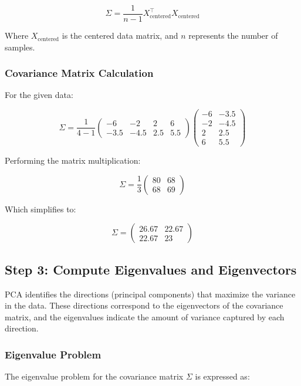 \documentclass{exam}
\begin{document}
\[
\Sigma = \frac{1}{n-1} X_{\text{centered}}^\top X_{\text{centered}}
\]

Where \( X_{\text{centered}} \) is the centered data matrix, and \( n \) represents the number of samples.

\subsubsection*{Covariance Matrix Calculation}

For the given data:

\[
\Sigma = \frac{1}{4-1} \begin{pmatrix} -6 & -2 & 2 & 6 \\ -3.5 & -4.5 & 2.5 & 5.5 \end{pmatrix} \begin{pmatrix} -6 & -3.5 \\ -2 & -4.5 \\ 2 & 2.5 \\ 6 & 5.5 \end{pmatrix}
\]

Performing the matrix multiplication:

\[
\Sigma = \frac{1}{3} \begin{pmatrix} 80 & 68 \\ 68 & 69 \end{pmatrix}
\]

Which simplifies to:

\[
\Sigma = \begin{pmatrix} 26.67 & 22.67 \\ 22.67 & 23 \end{pmatrix}
\]

\subsection{Step 3: Compute Eigenvalues and Eigenvectors}

PCA identifies the directions (principal components) that maximize the variance in the data. These directions correspond to the eigenvectors of the covariance matrix, and the eigenvalues indicate the amount of variance captured by each direction.

\subsubsection*{Eigenvalue Problem}

The eigenvalue problem for the covariance matrix \( \Sigma \) is expressed as:
\end{document}
